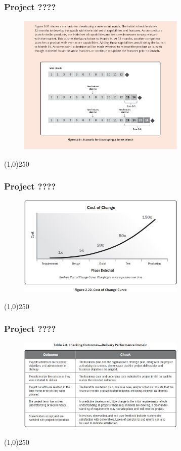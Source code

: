\begin{frame}
\frametitle{Project ????}
 \begin{figure}
    \centering
        \includegraphics[width = 8cm]{../images/guide/Fig2-21.jpg}
    \label{guidefig:2-21}
 \end{figure}
\end{frame}
\begin{center}\line(1,0){250}\end{center}

\begin{frame}
\frametitle{Project ????}
 \begin{figure}
    \centering
        \includegraphics[width = 8cm]{../images/guide/Fig2-22.jpg}
    \label{guidefig:2-22}
 \end{figure}
\end{frame}
\begin{center}\line(1,0){250}\end{center}



\begin{frame}
\frametitle{Project ????}
 \begin{figure}
    \centering
        \includegraphics[width = 8cm]{../images/guide/Table2-8.jpg}
    \label{guideTable:2-8}
 \end{figure}
\end{frame}
\begin{center}\line(1,0){250}\end{center}



